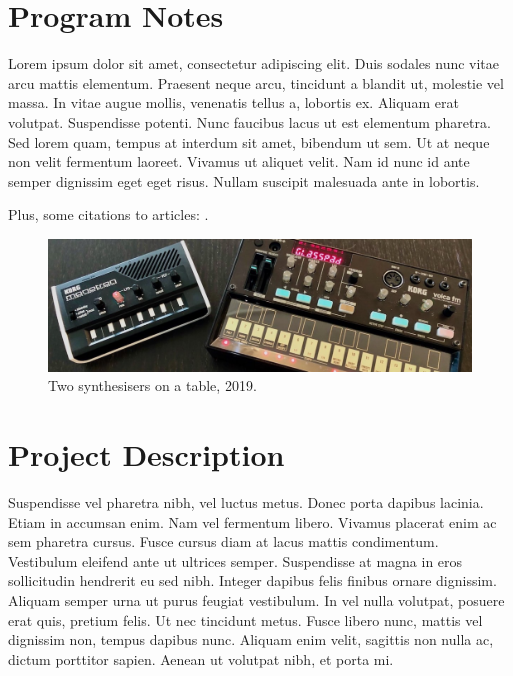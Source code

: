 \documentclass[acmsmall]{nimeart}
\begin{document}
\section{Program Notes}

Lorem ipsum dolor sit amet, consectetur adipiscing elit. Duis sodales nunc vitae arcu mattis elementum. Praesent neque arcu, tincidunt a blandit ut, molestie vel massa. In vitae augue mollis, venenatis tellus a, lobortis ex. Aliquam erat volutpat. Suspendisse potenti. Nunc faucibus lacus ut est elementum pharetra. Sed lorem quam, tempus at interdum sit amet, bibendum ut sem. Ut at neque non velit fermentum laoreet. Vivamus ut aliquet velit. Nam id nunc id ante semper dignissim eget eget risus. Nullam suscipit malesuada ante in lobortis.

Plus, some citations to articles: \cite{doe2023,
wizard2022, alien2024}.

\begin{figure}[h]
  \centering
  \includegraphics[width=\linewidth]{images/sampleteaser.pdf}
  \caption{Two synthesisers on a table, 2019.}
\end{figure}

\section{Project Description}

Suspendisse vel pharetra nibh, vel luctus metus. Donec porta dapibus lacinia. Etiam in accumsan enim. Nam vel fermentum libero. Vivamus placerat enim ac sem pharetra cursus. Fusce cursus diam at lacus mattis condimentum. Vestibulum eleifend ante ut ultrices semper. Suspendisse at magna in eros sollicitudin hendrerit eu sed nibh. Integer dapibus felis finibus ornare dignissim. Aliquam semper urna ut purus feugiat vestibulum. In vel nulla volutpat, posuere erat quis, pretium felis. Ut nec tincidunt metus. Fusce libero nunc, mattis vel dignissim non, tempus dapibus nunc. Aliquam enim velit, sagittis non nulla ac, dictum porttitor sapien. Aenean ut volutpat nibh, et porta mi.
\end{document}
